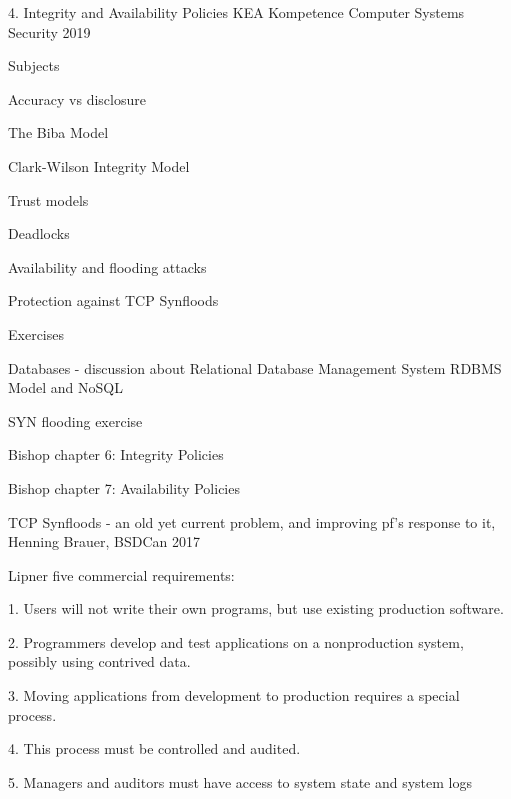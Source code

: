 \documentclass[Screen16to9,17pt]{foils}
\begin{document}
\mytitlepage
{4. Integrity and Availability Policies}
{KEA Kompetence Computer Systems Security 2019}



\begin{list1}
\item Subjects
\begin{list2}
\item Accuracy vs disclosure
\item The Biba Model
\item Clark-Wilson Integrity Model
\item Trust models
\item Deadlocks
\item Availability and flooding attacks
\item Protection against TCP Synfloods
\end{list2}
\item Exercises
\begin{list2}
\item Databases - discussion about Relational Database Management System RDBMS Model and NoSQL
\item SYN flooding exercise
\end{list2}
\end{list1}




\begin{list1}
\item Bishop chapter 6: Integrity Policies
\item Bishop chapter 7: Availability Policies
\item TCP Synfloods - an old yet current problem, and improving pf's response to it, Henning Brauer, BSDCan 2017
\end{list1}


Lipner five commercial requirements:
\begin{list2}
\item[1.] Users will not write their own programs, but use existing
  production software.
\item[2.] Programmers develop and test applications on a nonproduction system, possibly using contrived data.
\item[3.] Moving applications from development to production requires a special process.
\item[4.] This process must be controlled and audited.
\item[5.] Managers and auditors must have access to system state and system logs
\end{list2}
\end{document}
